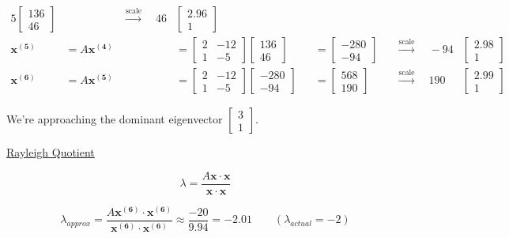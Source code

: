 \documentclass[12pt]{article}
\begin{document}
\begin{alignat*}{5}
\begin{bmatrix} 136 \\ 46 \end{bmatrix} &&\xrightarrow{\text{scale}}\quad
46&\begin{bmatrix} 2.96 \\ 1 \end{bmatrix}
\\
\mathbf{x^{(5)}} &= A\mathbf{x^{(4)}} &&=
\begin{bmatrix} 2 & -12 \\ 1 & -5 \end{bmatrix}\begin{bmatrix} 136 \\ 46 \end{bmatrix} &&=
\begin{bmatrix} -280 \\ -94 \end{bmatrix} &&\xrightarrow{\text{scale}}\quad
-94&\begin{bmatrix} 2.98 \\ 1 \end{bmatrix}
\\
\mathbf{x^{(6)}} &= A\mathbf{x^{(5)}} &&=
\begin{bmatrix} 2 & -12 \\ 1 & -5 \end{bmatrix}\begin{bmatrix} -280 \\ -94 \end{bmatrix} &&=
\begin{bmatrix} 568 \\ 190 \end{bmatrix} &&\xrightarrow{\text{scale}}\quad
190&\begin{bmatrix} 2.99 \\ 1 \end{bmatrix}
\end{alignat*}

We're approaching the dominant eigenvector $\begin{bmatrix} 3 \\ 1 \end{bmatrix}$.

\underline{Rayleigh Quotient}

\begin{equation*}
\lambda = \frac{A\mathbf{x}\cdot\mathbf{x}}{\mathbf{x}\cdot\mathbf{x}}
\end{equation*}

\begin{equation*}
\lambda_{approx} = \frac{A\mathbf{x^{(6)}}\cdot\mathbf{x^{(6)}}}{\mathbf{x^{(6)}}\cdot\mathbf{x^{(6)}}} \approx
\frac{-20}{9.94} = -2.01 \qquad (\lambda_{actual} = -2)
\end{equation*}
\end{document}
